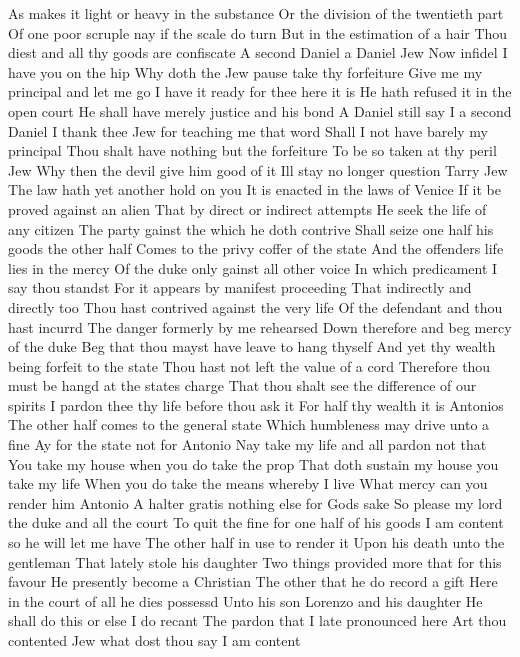 As makes it light or heavy in the substance
Or the division of the twentieth part
Of one poor scruple nay if the scale do turn
But in the estimation of a hair
Thou diest and all thy goods are confiscate
A second Daniel a Daniel Jew
Now infidel I have you on the hip
Why doth the Jew pause take thy forfeiture
Give me my principal and let me go
I have it ready for thee here it is
He hath refused it in the open court
He shall have merely justice and his bond
A Daniel still say I a second Daniel
I thank thee Jew for teaching me that word
Shall I not have barely my principal
Thou shalt have nothing but the forfeiture
To be so taken at thy peril Jew
Why then the devil give him good of it
Ill stay no longer question
Tarry Jew
The law hath yet another hold on you
It is enacted in the laws of Venice
If it be proved against an alien
That by direct or indirect attempts
He seek the life of any citizen
The party gainst the which he doth contrive
Shall seize one half his goods the other half
Comes to the privy coffer of the state
And the offenders life lies in the mercy
Of the duke only gainst all other voice
In which predicament I say thou standst
For it appears by manifest proceeding
That indirectly and directly too
Thou hast contrived against the very life
Of the defendant and thou hast incurrd
The danger formerly by me rehearsed
Down therefore and beg mercy of the duke
Beg that thou mayst have leave to hang thyself
And yet thy wealth being forfeit to the state
Thou hast not left the value of a cord
Therefore thou must be hangd at the states charge
That thou shalt see the difference of our spirits
I pardon thee thy life before thou ask it
For half thy wealth it is Antonios
The other half comes to the general state
Which humbleness may drive unto a fine
Ay for the state not for Antonio
Nay take my life and all pardon not that
You take my house when you do take the prop
That doth sustain my house you take my life
When you do take the means whereby I live
What mercy can you render him Antonio
A halter gratis nothing else for Gods sake
So please my lord the duke and all the court
To quit the fine for one half of his goods
I am content so he will let me have
The other half in use to render it
Upon his death unto the gentleman
That lately stole his daughter
Two things provided more that for this favour
He presently become a Christian
The other that he do record a gift
Here in the court of all he dies possessd
Unto his son Lorenzo and his daughter
He shall do this or else I do recant
The pardon that I late pronounced here
Art thou contented Jew what dost thou say
I am content

